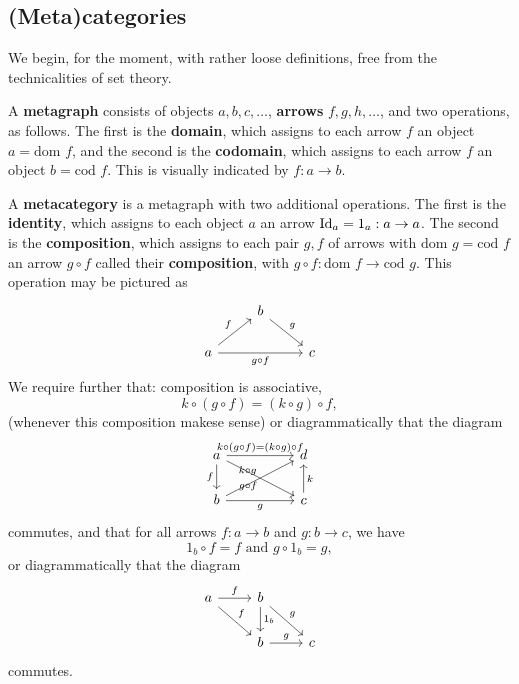 \documentclass{../../mathnotes}
\title{}
\author{Nilay Kumar}
\date{June 4, 2014}
\begin{document}
\maketitle

\subsection*{(Meta)categories}

We begin, for the moment, with rather loose definitions, free from the technicalities of set theory.

\begin{defn}
    A \textbf{metagraph} consists of objects $a,b,c,\ldots$, \textbf{arrows} $f,g,h,\ldots$, and two
    operations, as follows. The first is the \textbf{domain}, which assigns to each arrow $f$ an object $a=\text{dom }f$,
    and the second is the \textbf{codomain}, which assigns to each arrow $f$ an object $b=\text{cod }f$.
    This is visually indicated by $f:a\to b$.
\end{defn}

\begin{defn}
    A \textbf{metacategory} is a metagraph with two additional operations. The first is the \textbf{identity},
    which assigns to each object $a$ an arrow $\operatorname{Id}_a=1_a:a\to a$. The second is the \textbf{composition},
    which assigns to each pair $g,f$ of arrows with $\text{dom }g=\text{cod }f$ an arrow $g\circ f$ called
    their \textbf{composition}, with $g\circ f:\text{dom }f\to\text{cod }g$. This operation may be pictured as
    \begin{equation*}
        \begin{tikzcd}
            \;&b\ar{rd}{g}&\\
            a\ar{ru}{f}\ar[swap]{rr}{g\circ f}&&c
        \end{tikzcd}
    \end{equation*}
    We require further that: composition is associative,
    \[k\circ(g\circ f)=(k\circ g)\circ f,\]
    (whenever this composition makese sense) or diagrammatically that the diagram
    \begin{equation*}
        \begin{tikzcd}
            a\ar{rr}{k\circ(g\circ f)=(k\circ g)\circ f}\ar[swap]{d}{f}\ar[swap]{drr}{g\circ f} && d\\
            b\ar{urr}{k\circ g}\ar[swap]{rr}{g} && c\ar[swap]{u}{k}
        \end{tikzcd}
    \end{equation*}
    commutes, and that for all arrows $f:a\to b$ and $g:b\to c$, we have
    \[1_b\circ f=f \text{ and }g\circ 1_b=g,\]
    or diagrammatically that the diagram
    \begin{equation*}
        \begin{tikzcd}
            a\ar{r}{f}\ar{dr}{f} & b\ar{d}{1_b}\ar{rd}{g} &\\
            & b\ar{r}{g} & c
        \end{tikzcd}
    \end{equation*}
    commutes.
\end{defn}
\end{document}

